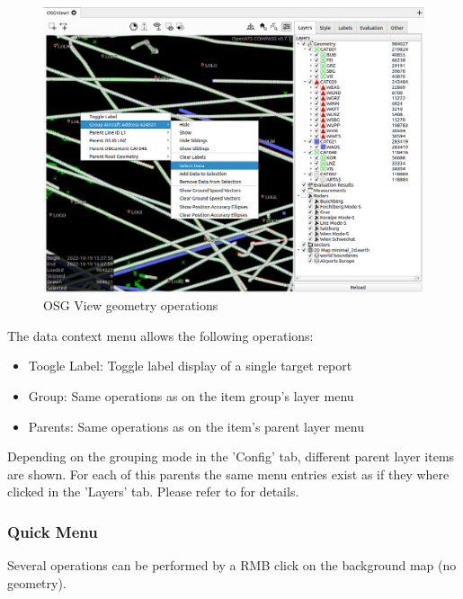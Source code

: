 \begin{figure}[H]
    \hspace*{-2.5cm}
    \includegraphics[width=19cm,frame]{figures/osgview_data_operations.png}
  \caption{OSG View geometry operations}
\end{figure}

The data context menu allows the following operations:

\begin{itemize}
 \item Toogle Label: Toggle label display of a single target report
 \item Group: Same operations as on the item group's layer menu
 \item Parents: Same operations as on the item's parent layer menu
\end{itemize}

Depending on the grouping mode in the 'Config' tab, different parent layer items are shown. For each of this parents the same menu entries exist as if they where clicked in the 'Layers' tab. Please refer to  for details.


\subsubsection{Quick Menu}

Several operations can be performed by a RMB click on the background map (no geometry).

